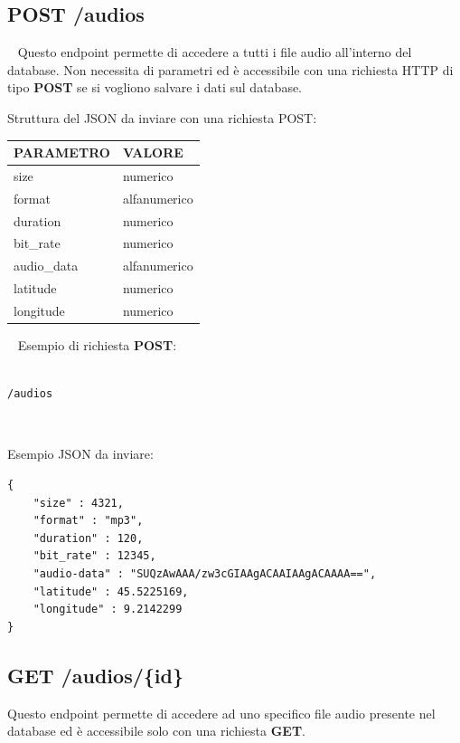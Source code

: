 \subsection{POST /audios}
\ \linebreak
Questo endpoint permette di accedere a tutti i file audio all'interno del database. Non necessita di parametri ed è accessibile con una richiesta HTTP di tipo \textbf{POST} se si vogliono salvare i dati sul database.

Struttura del JSON da inviare con una richiesta POST:

\begin{table}[!h]
	\centering
	\begin{tabular}{@{}ll@{}}
		\toprule
		\textbf{PARAMETRO} & \textbf{VALORE}  \\ \midrule
		size               & numerico\\ 
		format             & alfanumerico\\
		duration           & numerico\\
		bit\_rate          & numerico\\
		audio\_data        & alfanumerico\\
		latitude           & numerico\\ 
		longitude          & numerico\\ \bottomrule		
	\end{tabular}
\end{table}

\ \linebreak
Esempio di richiesta \textbf{POST}:
\begin{lstlisting}

/audios	

\end{lstlisting}

\ \linebreak

Esempio JSON da inviare:
\begin{lstlisting}
{
	"size" : 4321,
	"format" : "mp3",
	"duration" : 120,
	"bit_rate" : 12345,
	"audio-data" : "SUQzAwAAA/zw3cGIAAgACAAIAAgACAAAA==",
	"latitude" : 45.5225169,
	"longitude" : 9.2142299
}
\end{lstlisting}

\subsection{GET /audios/\{id\}}
Questo endpoint permette di accedere ad uno specifico file audio presente nel database ed è accessibile solo con una richiesta \textbf{GET}.

